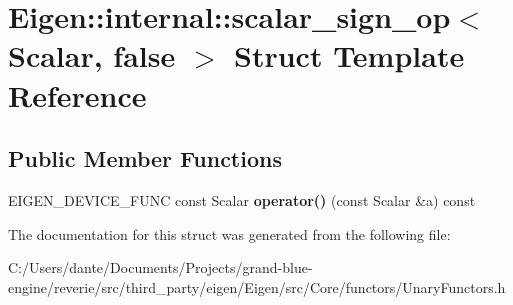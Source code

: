 \hypertarget{struct_eigen_1_1internal_1_1scalar__sign__op_3_01_scalar_00_01false_01_4}{}\section{Eigen\+::internal\+::scalar\+\_\+sign\+\_\+op$<$ Scalar, false $>$ Struct Template Reference}
\label{struct_eigen_1_1internal_1_1scalar__sign__op_3_01_scalar_00_01false_01_4}
\subsection*{Public Member Functions}
\begin{DoxyCompactItemize}
\item 
\mbox{\label{struct_eigen_1_1internal_1_1scalar__sign__op_3_01_scalar_00_01false_01_4_a909551c134130cb907fd59bc25490273}} 
E\+I\+G\+E\+N\+\_\+\+D\+E\+V\+I\+C\+E\+\_\+\+F\+U\+NC const Scalar {\bfseries operator()} (const Scalar \&a) const
\end{DoxyCompactItemize}


The documentation for this struct was generated from the following file\+:\begin{DoxyCompactItemize}
\item 
C\+:/\+Users/dante/\+Documents/\+Projects/grand-\/blue-\/engine/reverie/src/third\+\_\+party/eigen/\+Eigen/src/\+Core/functors/Unary\+Functors.\+h\end{DoxyCompactItemize}
